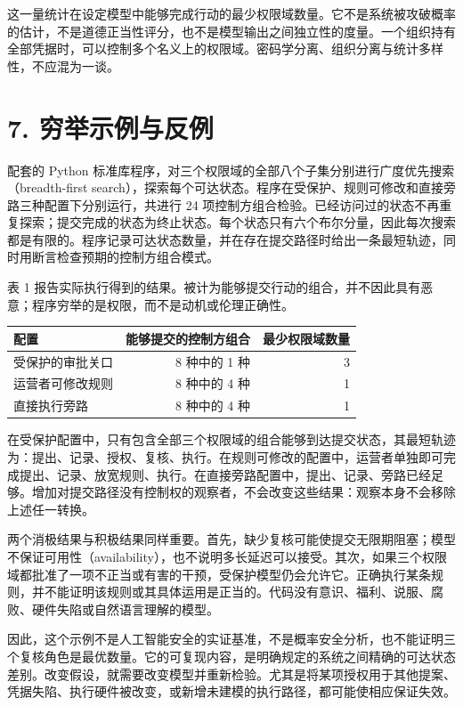 \documentclass[11pt,a4paper,fontset=fandol]{ctexart}
\begin{document}
这一量统计在设定模型中能够完成行动的最少权限域数量。它不是系统被攻破概率的估计，不是道德正当性评分，也不是模型输出之间独立性的度量。一个组织持有全部凭据时，可以控制多个名义上的权限域。密码学分离、组织分离与统计多样性，不应混为一谈。

\hypertarget{section-8}{%
\section{7. 穷举示例与反例}\label{section-8}}

配套的 Python 标准库程序，对三个权限域的全部八个子集分别进行广度优先搜索（breadth-first search），探索每个可达状态。程序在受保护、规则可修改和直接旁路三种配置下分别运行，共进行 24 项控制方组合检验。已经访问过的状态不再重复探索；提交完成的状态为终止状态。每个状态只有六个布尔分量，因此每次搜索都是有限的。程序记录可达状态数量，并在存在提交路径时给出一条最短轨迹，同时用断言检查预期的控制方组合模式。

表 1 报告实际执行得到的结果。被计为能够提交行动的组合，并不因此具有恶意；程序穷举的是权限，而不是动机或伦理正确性。

\begin{longtable}[]{@{}lrr@{}}
\toprule\noalign{}
配置 & 能够提交的控制方组合 & 最少权限域数量 \\
\midrule\noalign{}
\endhead
\bottomrule\noalign{}
\endlastfoot
受保护的审批关口 & 8 种中的 1 种 & 3 \\
运营者可修改规则 & 8 种中的 4 种 & 1 \\
直接执行旁路 & 8 种中的 4 种 & 1 \\
\end{longtable}

在受保护配置中，只有包含全部三个权限域的组合能够到达提交状态，其最短轨迹为：提出、记录、授权、复核、执行。在规则可修改的配置中，运营者单独即可完成提出、记录、放宽规则、执行。在直接旁路配置中，提出、记录、旁路已经足够。增加对提交路径没有控制权的观察者，不会改变这些结果：观察本身不会移除上述任一转换。

两个消极结果与积极结果同样重要。首先，缺少复核可能使提交无限期阻塞；模型不保证可用性（availability），也不说明多长延迟可以接受。其次，如果三个权限域都批准了一项不正当或有害的干预，受保护模型仍会允许它。正确执行某条规则，并不能证明该规则或其具体运用是正当的。代码没有意识、福利、说服、腐败、硬件失陷或自然语言理解的模型。

因此，这个示例不是人工智能安全的实证基准，不是概率安全分析，也不能证明三个复核角色是最优数量。它的可复现内容，是明确规定的系统之间精确的可达状态差别。改变假设，就需要改变模型并重新检验。尤其是将某项授权用于其他提案、凭据失陷、执行硬件被改变，或新增未建模的执行路径，都可能使相应保证失效。
\end{document}
